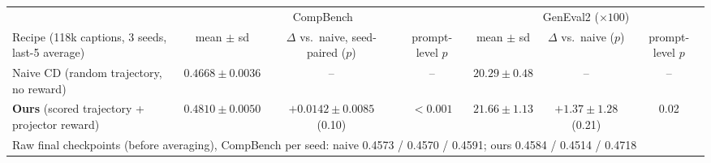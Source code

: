 \begin{tabular}{l c c c c c c}
\toprule
 & \multicolumn{3}{c}{CompBench} & \multicolumn{3}{c}{GenEval2 ($\times100$)} \\
\cmidrule(lr){2-4}\cmidrule(lr){5-7}
Recipe (118k captions, 3 seeds, last-5 average) & mean $\pm$ sd & $\Delta$ vs.\ naive, seed-paired ($p$) & prompt-level $p$ & mean $\pm$ sd & $\Delta$ vs.\ naive ($p$) & prompt-level $p$ \\
\midrule
Naive CD (random trajectory, no reward) & $0.4668\pm0.0036$ & -- & -- & $20.29\pm0.48$ & -- & -- \\
\textbf{Ours} (scored trajectory + projector reward) & $\mathbf{0.4810}\pm0.0050$ & $+0.0142\pm0.0085$ (0.10) & $<0.001$ & $\mathbf{21.66}\pm1.13$ & $+1.37\pm1.28$ (0.21) & 0.02 \\
\midrule
\multicolumn{7}{l}{\footnotesize Raw final checkpoints (before averaging), CompBench per seed: naive 0.4573 / 0.4570 / 0.4591; ours 0.4584 / 0.4514 / 0.4718} \\
\bottomrule
\end{tabular}